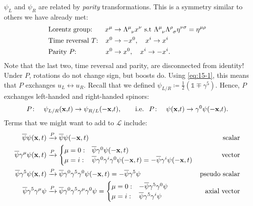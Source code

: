$\psi_L$ and $\psi_R$ are related by \emph{parity} transformations. This is a symmetry similar to others we have already met:
\begin{align}
  &\text{Lorentz group:} &x^{\mu} &\to \Lambda \indices{^{\mu}_{\nu}} x^{\nu} \text{ s.t } \Lambda \indices{^{\mu}_{\nu}} \Lambda \indices{^{\rho}_{\sigma}} \eta^{\nu\sigma} = \eta^{\mu\rho} \\
  &\text{Time reversal $T$:} &x^0 &\to - x^0, \quad x^i \to x^i \\
  &\text{Parity $P$:} &x^0 &\to x^0, \quad x^i \to -x^i.
\end{align}
Note that the last two, time reversal and parity, are disconnected from identity!
Under $P$, rotations do not change sign, but boosts do. Using \eqref{eq:15-1}, this means that $P$ exchanges $u_L \leftrightarrow u_R$.
Recall that we defined $\psi_{L/R} \coloneqq \frac{1}{2} (\mathbb{1} \mp \gamma^5)$. Hence, $P$ exchanges left-handed and right-handed spinors:
\begin{equation}
  P\colon \quad \psi_{L/R} (\vb{x,} t) \to \psi_{R/L} (-\vb{x,} t), \qquad \text{i.e. }\; P \colon \quad \psi(\vb{x,} t) \to \gamma^0 \psi(-\vb{x,} t).
\end{equation}
Terms that we might want to add to $\mathcal{L}$ include:
\begin{align}
  \overline{\psi}\psi(\vb{x}, t) &\xrightarrow{P} \overline{\psi}\psi(-\vb{x}, t) \qquad &\text{scalar} \\
  \overline{\psi}\gamma^{\mu} \psi(\vb{x} , t) &\xrightarrow{P} 
  \begin{cases}
    \mu = 0: & \overline{\psi} \gamma^0 \psi(-\vb{x}, t) \\
    \mu = i: & \overline{\psi} \gamma^0 \gamma^i \gamma^0 \psi(-\vb{x}, t) = -\overline{\psi}\gamma^i \psi(-\vb{x}, t)
  \end{cases}
  &\text{vector} \\
  \overline{\psi} \gamma^5 \psi(\vb{x}, t) &\xrightarrow{P} \overline{\psi} \gamma^0 \gamma^5 \gamma^0 \psi(-\vb{x}, t) = -\overline{\psi} \gamma^5 \psi & \text{pseudo scalar} \\
  \overline{\psi}\gamma^5 \gamma^{\mu} \psi &\xrightarrow{P} \overline{\psi}\gamma^0 \gamma^5 \gamma^{\mu} \gamma^0 \psi = 
  \begin{cases}
    \mu =0: & -\overline{\psi} \gamma^5 \gamma^0 \psi \\
    \mu = i: & \overline{\psi}\gamma^5 \gamma^i \psi
  \end{cases}
					    & \text{axial vector}
\end{align}

